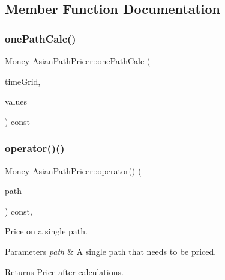 \subsection{Member Function Documentation}
\hypertarget{class_asian_path_pricer_a33d53acde0a8553f4adcee70c47f50b4}{}\label{class_asian_path_pricer_a33d53acde0a8553f4adcee70c47f50b4} 
\subsubsection{\texorpdfstring{one\+Path\+Calc()}{onePathCalc()}}
{\footnotesize\ttfamily \hyperlink{_name_def_8h_a5a9d48c16a694e9a2d9f1eca730dc8c5}{Money} Asian\+Path\+Pricer\+::one\+Path\+Calc (\begin{DoxyParamCaption}\item[{const vector$<$ \hyperlink{_name_def_8h_ac2d3e0ba793497bcca555c7c2cf64ff3}{Time} $>$ \&}]{time\+Grid,  }\item[{const vector$<$ vector$<$ \hyperlink{_name_def_8h_a642a6c5fd87319d922637de0e0bb0305}{Quote} $>$ $>$ \&}]{values }\end{DoxyParamCaption}) const\hspace{0.3cm}{\ttfamily [private]}}

\hypertarget{class_asian_path_pricer_a929e8a33447f977bfc947e1d5344e353}{}\label{class_asian_path_pricer_a929e8a33447f977bfc947e1d5344e353} 
\subsubsection{\texorpdfstring{operator()()}{operator()()}}
{\footnotesize\ttfamily \hyperlink{_name_def_8h_a5a9d48c16a694e9a2d9f1eca730dc8c5}{Money} Asian\+Path\+Pricer\+::operator() (\begin{DoxyParamCaption}\item[{const \hyperlink{class_path}{Path}$<$ \hyperlink{struct_single_variate}{Single\+Variate} $>$ \&}]{path }\end{DoxyParamCaption}) const\hspace{0.3cm}{\ttfamily [override]}, {\ttfamily [virtual]}}



Price on a single path. 


\begin{DoxyParams}{Parameters}
{\em path} & A single path that needs to be priced. \\
\hline
\end{DoxyParams}
\begin{DoxyReturn}{Returns}
Price after calculations. 
\end{DoxyReturn}


